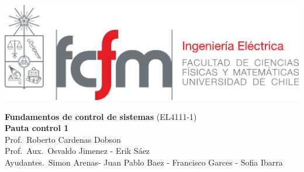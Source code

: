 \documentclass[
  11pt,
  letterpaper,
   addpoints,
  ]{exam}
\begin{document}
\noindent
\begin{minipage}{0.47\textwidth}
\includegraphics[width=\textwidth]{../fcfm_die}
\end{minipage}
\begin{minipage}{0.53\textwidth}
\begin{center} 
\large\textbf{Fundamentos de control de sistemas} (EL4111-1) \\
\large\textbf{Pauta control 1} \\
\small Prof.~Roberto Cardenas Dobson\\
\small Prof.~Aux.~Osvaldo Jimenez - Erik Sáez\\
\small Ayudantes.~Simon Arenas- Juan Pablo Baez - Francisco Garces - Sofia Ibarra\\
\end{center}
\end{minipage}

\vspace{0.5cm}
\noindent
\vspace{.85cm}
\end{document}

